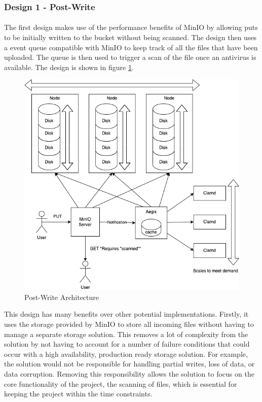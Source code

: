 \documentclass[12pt, conference, final, a4paper, onecolumn, compsoc]{IEEEtran}
\begin{document}

    \subsubsection*{Design 1 - Post-Write}
    \paragraph{}

    The first design makes use of the performance benefits of MinIO by allowing
    puts to be initially written to the bucket without being scanned. The design
    then uses a event queue compatible with MinIO to keep track of all the files
    that have been uploaded. The queue is then used to trigger a scan of the
    file once an antivirus is available. The design is shown in figure
    \ref{fig:postWriteArch}.

    \begin{figure}
      \includegraphics[scale=.4]{diagrams/post-write.png}
      \caption{Post-Write Architecture}
      \label{fig:postWriteArch}
    \end{figure}

    This design has many benefits over other potential implementations. Firstly,
    it uses the storage provided by MinIO to store all incoming files without
    having to manage a separate storage solution. This removes a lot of
    complexity from the solution by not having to account for a number of
    failure conditions that could occur with a high availability, production
    ready storage solution. For example, the solution would not be responsible
    for handling partial writes, loss of data, or data corruption. Removing this
    responsibility allows the solution to focus on the core functionality of the
    project, the scanning of files, which is essential for keeping the project
    within the time constraints.
\end{document}

